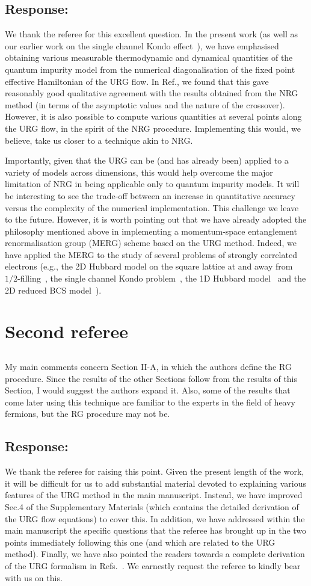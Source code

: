 \documentclass{article}
\newcommand{\response}[1]{{\color{blue}\subsection*{Response:}{#1}}}
\newcommand{\point}[1]{\subsection{}{#1}}
\begin{document}
\response{We thank the referee for this excellent question. In the present work (as well as our earlier work on the single channel Kondo effect~\cite{kondo_urg}), we have emphasised obtaining various measurable thermodynamic and dynamical quantities of the quantum impurity model from the numerical diagonalisation of the fixed point effective Hamiltonian of the URG flow. In Ref.\cite{kondo_urg}, we found that this gave reasonably good qualitative agreement with the results obtained from the NRG method (in terms of the asymptotic values and the nature of the crossover). However, it is also possible to compute various quantities at several points along the URG flow, in the spirit of the NRG procedure. Implementing this would, we believe, take us closer to a technique akin to NRG. 
\par\noindent
Importantly, given that the URG can be (and has already been) applied to a variety of models across dimensions, this would help overcome the major limitation of NRG in being applicable only to quantum impurity models. It will be interesting to see the trade-off between an increase in quantitative accuracy versus the complexity of the numerical implementation. This challenge we leave to the future. However, it is worth pointing out that we have already adopted the philosophy mentioned above in implementing a momentum-space entanglement renormalisation group (MERG) scheme based on the URG method. Indeed, we have applied the MERG to the study of several problems of strongly correlated electrons (e.g., the 2D Hubbard model on the square lattice at and away from $1/2$-filling~\cite{mukherjeeMERG2022}, the single channel Kondo problem~\cite{kondo_urg}, the 1D Hubbard model~\cite{1dhubjhep} and the 2D reduced BCS model~\cite{siddharthacpi}).}

\section{Second referee}

\point{
My main comments concern Section II-A, in which the authors define the RG procedure. Since the results of the other Sections follow from the results of this Section, I would suggest the authors expand it. Also, some of the results that come later using this technique are familiar to the experts in the field of heavy fermions, but the RG procedure may not be.}

\response{We thank the referee for raising this point. Given the present length of the work, it will be difficult for us to add substantial material devoted to explaining various features of the URG method in the main manuscript. Instead, we have improved Sec.4 of the Supplementary Materials (which contains the detailed derivation of the URG flow equations) to cover this. In addition, we have addressed within the main manuscript the specific questions that the referee has brought up in the two points immediately following this one (and which are related to the URG method). Finally, we have also pointed the readers towards a complete derivation of the URG formalism in Refs.~\cite{anirbanurg1,anirbanurg2}. We earnestly request the referee to kindly bear with us on this.}
\end{document}
